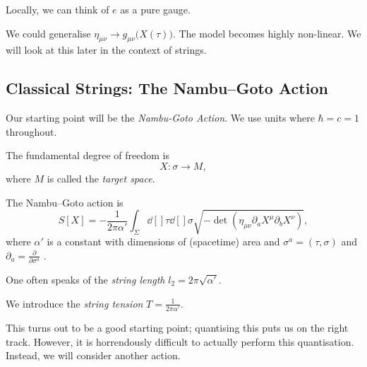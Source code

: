 \begin{leftbar}
  Locally, we can think of $e$ as a pure gauge.
\end{leftbar}

\begin{remark}
  We could generalise $\eta_{\mu\nu} \to g_{\mu\nu}\big(X(\tau)\big)$. 
  The model becomes highly non-linear.
  We will look at this later in the context of strings.
\end{remark}

\subsection{Classical Strings: The Nambu--Goto Action}%
\label{sub:classical_strings}

Our starting point will be the \emph{Nambu-Goto Action}.
We use units where $\hbar = c = 1$ throughout.
\begin{figure}[tbhp]
  \centering
  \def\svgwidth{0.4\columnwidth}
  
  \caption{}
  \label{fig:l2f2}
\end{figure}
The fundamental degree of freedom is
\begin{equation}
  X \colon \sigma \to M,
\end{equation}
where $M$ is called the \emph{target space}.

\begin{definition}
  The Nambu--Goto action is
  \begin{equation}
    S[X] = -\frac{1}{2\pi \alpha'} \int_{\Sigma} \dd[]{\tau} \dd[]{\sigma} \sqrt{-\det(\eta_{\mu\nu} \partial_{a} X^{\mu} \partial_{b} X^{\nu})},
  \end{equation}
  where $\alpha'$ is a constant with dimensions of (spacetime) area and $\sigma^{a} = (\tau, \sigma)$  and $\partial_{a} = \frac{\partial}{\partial \sigma^{a}}$ .
\end{definition}

\begin{remark}
  One often speaks of the \emph{string length} $l_2 = 2 \pi \sqrt{\alpha'}$.
\end{remark}

\begin{definition}
  We introduce the \emph{string tension} $T = \frac{1}{2 \pi \alpha'}$.
\end{definition}

\begin{leftbar}
  This turns out to be a good starting point; quantising this puts us on the right track. However, it is horrendously difficult to actually perform this quantisation. Instead, we will consider another action.
\end{leftbar}

